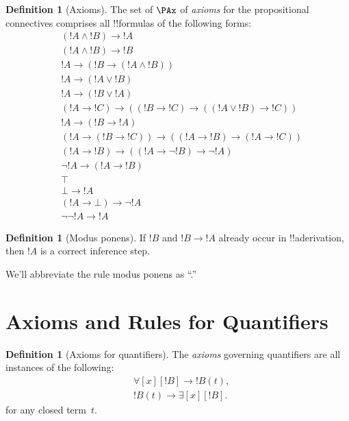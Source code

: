 \documentclass[10pt,a4paper]{article}
\theoremstyle{plain}
\theoremstyle{definition}
\newtheorem{defn}[thm]{Definition}
\theoremstyle{remark}
\newcommand*{\olfileid}[3]{}
\newcommand*{\olsection}[1]{\section*{#1}}
\newcommand*{\ollabel}[1]{\label{#1}}
\providecommand{\lif}{\mathbin{\rightarrow}}
\providecommand{\lforall}{\mathord{\forall}}
\providecommand{\lexists}{\mathord{\exists}}
\providecommand{\ltrue}{\top}
\providecommand{\lfalse}{\bot}
\begin{document}
\begin{defn}[Axioms]
The set of $\PAx$ of \emph{axioms} for the propositional connectives comprises
all !!{formula}s of the following forms:
\begin{align}
  & (!A \land !B) \lif !A \ollabel{ax:land1}\\
  & (!A \land !B) \lif !B \ollabel{ax:land2}\\
  & !A \lif (!B \lif (!A \land !B)) \ollabel{ax:land3}\\
  & !A \lif (!A \lor !B) \ollabel{ax:lor1}\\
  & !A \lif (!B \lor !A) \ollabel{ax:lor2}\\
  & (!A \lif !C) \lif ((!B \lif !C) \lif ((!A \lor !B) \lif !C)) \ollabel{ax:lor3}\\
  & !A \lif (!B \lif !A) \ollabel{ax:lif1}\\
  & (!A \lif (!B \lif !C)) \lif ((!A \lif !B) \lif (!A \lif !C)) \ollabel{ax:lif2}\\
  & (!A \lif !B) \lif ((!A \lif \lnot !B) \lif \lnot !A) \ollabel{ax:lnot1}\\
  & \lnot !A \lif (!A \lif !B) \ollabel{ax:lnot2}\\
  & \ltrue \ollabel{ax:ltrue}\\
  & \lfalse \lif !A \ollabel{ax:lfalse1}\\
  & (!A \lif \lfalse) \lif \lnot !A \ollabel{ax:lfalse2}\\
  & \lnot\lnot !A \lif !A \ollabel{ax:dne}
\end{align}
\end{defn}

\begin{defn}[Modus ponens]
  If $!B$ and $!B \lif !A$ already occur in !!a{derivation}, then $!A$ is
  a correct inference step.
\end{defn}

We'll abbreviate the rule modus ponens as ``\MP.''





\olfileid{fol}{axd}{qua}

\olsection{Axioms and Rules for Quantifiers}

\begin{defn}[Axioms for quantifiers]
The \emph{axioms} governing quantifiers are
all instances of the following:
\begin{align}
\ollabel{ax:q1} & \lforall[x][!B] \lif !B(t), \\
\ollabel{ax:q2} & !B(t) \lif \lexists[x][!B].
\end{align}
for any closed term~$t$.
\end{defn}
\end{document}
